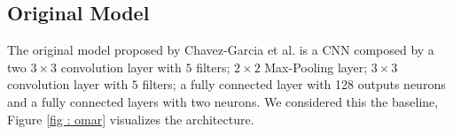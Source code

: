 \documentclass[../document.tex]{subfiles}
\begin{document}
\subsection{Original Model}
\label{subsec : vanilla-cnn}

The original model proposed by Chavez-Garcia et al. \cite{omar2018traversability} is a CNN composed by a two $3 \times 3$ convolution layer with $5$ filters; $2 \times 2$ Max-Pooling layer; $3 \times 3$ convolution layer with $5$ filters; a fully connected layer with 128 outputs neurons and a fully connected layers with two neurons. We considered this the baseline, Figure \ref{fig : omar} visualizes the architecture. 

\begin{figure}[htbp]
    \centering
    \begin{subfigure}[b]{0.25\linewidth}

\end{subfigure}
\end{figure}
\end{document}
